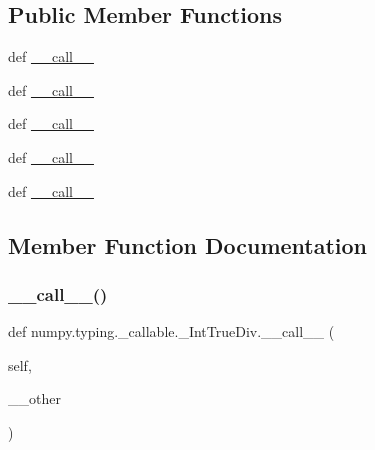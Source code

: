 \subsection*{Public Member Functions}
\begin{DoxyCompactItemize}
\item 
def \hyperlink{classnumpy_1_1typing_1_1__callable_1_1__IntTrueDiv_a4a1e737110e12909a396a05c597452bc}{\+\_\+\+\_\+call\+\_\+\+\_\+}
\item 
def \hyperlink{classnumpy_1_1typing_1_1__callable_1_1__IntTrueDiv_a4a1e737110e12909a396a05c597452bc}{\+\_\+\+\_\+call\+\_\+\+\_\+}
\item 
def \hyperlink{classnumpy_1_1typing_1_1__callable_1_1__IntTrueDiv_a4a1e737110e12909a396a05c597452bc}{\+\_\+\+\_\+call\+\_\+\+\_\+}
\item 
def \hyperlink{classnumpy_1_1typing_1_1__callable_1_1__IntTrueDiv_a4a1e737110e12909a396a05c597452bc}{\+\_\+\+\_\+call\+\_\+\+\_\+}
\item 
def \hyperlink{classnumpy_1_1typing_1_1__callable_1_1__IntTrueDiv_a4a1e737110e12909a396a05c597452bc}{\+\_\+\+\_\+call\+\_\+\+\_\+}
\end{DoxyCompactItemize}


\subsection{Member Function Documentation}
\mbox{\label{classnumpy_1_1typing_1_1__callable_1_1__IntTrueDiv_a4a1e737110e12909a396a05c597452bc}} 
\subsubsection{\texorpdfstring{\+\_\+\+\_\+call\+\_\+\+\_\+()}{\_\_call\_\_()}\hspace{0.1cm}{\footnotesize\ttfamily [1/5]}}
{\footnotesize\ttfamily def numpy.\+typing.\+\_\+callable.\+\_\+\+Int\+True\+Div.\+\_\+\+\_\+call\+\_\+\+\_\+ (\begin{DoxyParamCaption}\item[{}]{self,  }\item[{}]{\+\_\+\+\_\+other }\end{DoxyParamCaption})}

